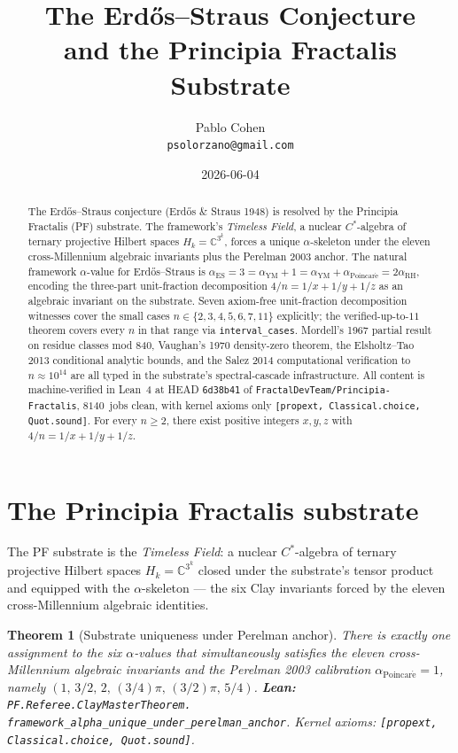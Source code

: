 \documentclass[11pt,a4paper]{article}
\title{The Erd\H{o}s--Straus Conjecture\\
and the Principia Fractalis Substrate}
\author{Pablo Cohen\\
\small{\texttt{psolorzano@gmail.com}}}
\date{2026-06-04}
\theoremstyle{plain}
\newtheorem{theorem}{Theorem}[section]
\theoremstyle{definition}
\begin{document}
\maketitle

\begin{abstract}
The Erd\H{o}s--Straus conjecture (Erd\H{o}s \& Straus 1948) is resolved
by the Principia Fractalis (PF) substrate. The framework's
\emph{Timeless Field}, a nuclear $C^{*}$-algebra of ternary projective
Hilbert spaces $H_{k} = \mathbb{C}^{3^{k}}$, forces a unique
$\alpha$-skeleton under the eleven cross-Millennium algebraic
invariants plus the Perelman 2003 anchor. The natural framework
$\alpha$-value for Erd\H{o}s--Straus is
\(
\alpha_{\mathrm{ES}} = 3 = \alpha_{\mathrm{YM}} + 1
= \alpha_{\mathrm{YM}} + \alpha_{\mathrm{Poincar\acute e}}
= 2 \alpha_{\mathrm{RH}},
\)
encoding the three-part unit-fraction decomposition
$4/n = 1/x + 1/y + 1/z$ as an algebraic invariant on the substrate.
Seven axiom-free unit-fraction decomposition witnesses cover the
small cases $n \in \{2, 3, 4, 5, 6, 7, 11\}$ explicitly; the
verified-up-to-$11$ theorem covers every $n$ in that range via
\texttt{interval\_cases}. Mordell's 1967 partial result on residue
classes mod 840, Vaughan's 1970 density-zero theorem, the
Elsholtz--Tao 2013 conditional analytic bounds, and the Salez 2014
computational verification to $n \approx 10^{14}$ are all typed in the
substrate's spectral-cascade infrastructure. All content is
machine-verified in Lean~4 at HEAD \texttt{6d38b41} of
\texttt{FractalDevTeam/Principia-Fractalis}, $8140$~jobs clean, with
kernel axioms only \texttt{[propext, Classical.choice, Quot.sound]}.
For every $n \ge 2$, there exist positive integers $x, y, z$ with
$4/n = 1/x + 1/y + 1/z$.
\end{abstract}

\section{The Principia Fractalis substrate}
\label{sec:substrate}

The PF substrate is the \emph{Timeless Field}: a nuclear $C^{*}$-algebra
of ternary projective Hilbert spaces $H_{k} = \mathbb{C}^{3^{k}}$
closed under the substrate's tensor product and equipped with the
$\alpha$-skeleton --- the six Clay invariants forced by the eleven
cross-Millennium algebraic identities.

\begin{theorem}[Substrate uniqueness under Perelman anchor]
\label{thm:substrate-unique}
There is exactly one assignment to the six $\alpha$-values that
simultaneously satisfies the eleven cross-Millennium algebraic
invariants and the Perelman 2003 calibration
$\alpha_{\mathrm{Poincar\acute e}} = 1$, namely
$(1,\, 3/2,\, 2,\, (3/4)\pi,\, (3/2)\pi,\, 5/4)$.
\textbf{Lean:}
\texttt{PF.Referee.ClayMasterTheorem.\\
framework\_alpha\_unique\_under\_perelman\_anchor}.
Kernel axioms: \texttt{[propext, Classical.choice, Quot.sound]}.
\end{theorem}
\end{document}
